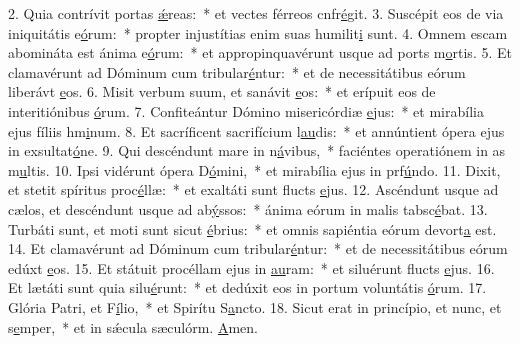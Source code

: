 2. Quia contrívit portas \uline{ǽ}reas:~* et vectes férreos cnfr\uline{é}git.
3. Suscépit eos de via iniquitátis e\uline{ó}rum:~* propter injustítias enim suas humilit\uline{i} sunt.
4. Omnem escam abomináta est ánima e\uline{ó}rum:~* et appropinquavérunt usque ad ports m\uline{o}rtis.
5. Et clamavérunt ad Dóminum cum tribular\uline{é}ntur:~* et de necessitátibus eórum liberávt \uline{e}os.
6. Misit verbum suum, et sanávit \uline{e}os:~* et erípuit eos de interitiónibus \uline{ó}rum.
7. Confiteántur Dómino misericórdiæ \uline{e}jus:~* et mirabília ejus fíliis hm\uline{i}num.
8. Et sacríficent sacrifícium l\uline{au}dis:~* et annúntient ópera ejus in exsultat\uline{ó}ne.
9. Qui descéndunt mare in n\uline{á}vibus,~* faciéntes operatiónem in as m\uline{u}ltis.
10. Ipsi vidérunt ópera D\uline{ó}mini,~* et mirabília ejus in prf\uline{ú}ndo.
11. Dixit, et stetit spíritus proc\uline{é}llæ:~* et exaltáti sunt flucts \uline{e}jus.
12. Ascéndunt usque ad cælos, et descéndunt usque ad ab\uline{ý}ssos:~* ánima eórum in malis tabsc\uline{é}bat.
13. Turbáti sunt, et moti sunt sicut \uline{é}brius:~* et omnis sapiéntia eórum devort\uline{a} est.
14. Et clamavérunt ad Dóminum cum tribular\uline{é}ntur:~* et de necessitátibus eórum edúxt \uline{e}os.
15. Et státuit procéllam ejus in \uline{au}ram:~* et siluérunt flucts \uline{e}jus.
16. Et lætáti sunt quia silu\uline{é}runt:~* et dedúxit eos in portum voluntátis \uline{ó}rum.
17. Glória Patri, et F\uline{í}lio,~* et Spirítu S\uline{a}ncto.
18. Sicut erat in princípio, et nunc, et s\uline{e}mper,~* et in sǽcula sæculórm. \uline{A}men.
